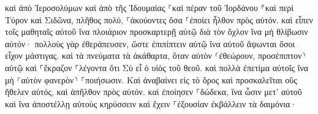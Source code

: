 \documentclass{openreader}
\begin{document}
καὶ ἀπὸ Ἱεροσολύμων καὶ ἀπὸ τῆς Ἰδουμαίας ⸀καὶ πέραν τοῦ Ἰορδάνου ⸁καὶ περὶ Τύρον καὶ Σιδῶνα, πλῆθος πολύ, ⸀ἀκούοντες ὅσα ⸀ἐποίει ἦλθον πρὸς αὐτόν. 
καὶ εἶπεν τοῖς μαθηταῖς αὐτοῦ ἵνα πλοιάριον προσκαρτερῇ αὐτῷ διὰ τὸν ὄχλον ἵνα μὴ θλίβωσιν αὐτόν· 
πολλοὺς γὰρ ἐθεράπευσεν, ὥστε ἐπιπίπτειν αὐτῷ ἵνα αὐτοῦ ἅψωνται ὅσοι εἶχον μάστιγας. 
καὶ τὰ πνεύματα τὰ ἀκάθαρτα, ὅταν αὐτὸν ⸂ἐθεώρουν, προσέπιπτον⸃ αὐτῷ καὶ ⸀ἔκραζον ⸀λέγοντα ὅτι Σὺ εἶ ὁ υἱὸς τοῦ θεοῦ. 
καὶ πολλὰ ἐπετίμα αὐτοῖς ἵνα μὴ ⸂αὐτὸν φανερὸν⸃ ⸀ποιήσωσιν. 
Καὶ ἀναβαίνει εἰς τὸ ὄρος καὶ προσκαλεῖται οὓς ἤθελεν αὐτός, καὶ ἀπῆλθον πρὸς αὐτόν. 
καὶ ἐποίησεν ⸀δώδεκα, ἵνα ὦσιν μετ’ αὐτοῦ καὶ ἵνα ἀποστέλλῃ αὐτοὺς κηρύσσειν 
καὶ ἔχειν ⸀ἐξουσίαν ἐκβάλλειν τὰ δαιμόνια· 
\end{document}

